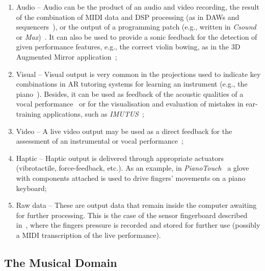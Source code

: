 \documentclass[10pt,journal,compsoc]{IEEEtran}
\newcommand{\node}[1]{{\fontfamily{cmss}\selectfont #1}}
\begin{document}
\begin{enumerate}[label=1.\arabic*.,leftmargin=0.7cm,listparindent=-\leftmargin, start=0]
\begin{enumerate}[label=1.2.\arabic*.,leftmargin=0.9cm,listparindent=-\leftmargin, start=0]
\item \node{Audio} -- Audio can be the product of an audio and video recording, the result of the combination of MIDI data and DSP processing (as in DAWs and sequencers~\cite{gall2005music}), or the output of a programming patch (e.g., written in \textit{Csound} or  \textit{Max})~\cite{manzo2016max}. It can also be used to provide a sonic feedback for the detection of given performance features, e.g., the correct violin bowing, as in the 3D Augmented Mirror application~\cite{3D_Augmented_Mirror};
\item \node{Visual} -- Visual output is very common in the projections used to indicate key combinations in AR tutoring systems for learning an instrument (e.g., the piano~\cite{holokeys}). Besides, it can be used as feedback of the acoustic qualities of a vocal performance~\cite{welch2004voxed} or for the visualisation and evaluation of mistakes in ear-training applications, such as \textit{IMUTUS}~\cite{imutus};
\item \node{Video} -- A live video output may be used as a direct feedback for the assessment of an instrumental or vocal performance~\cite{digital_violin_tutor};
\item \node{Haptic} -- Haptic output is delivered through appropriate actuators (vibrotactile, force-feedback, etc.). As an example, in \textit{PianoTouch}~\cite{pianotouch} a glove with components attached is used to drive fingers' movements on a piano keyboard;
\item \node{Raw data} -- These are output data that remain inside the computer awaiting for further processing. This is the case of the sensor fingerboard described in~\cite{grosshauser}, where the fingers pressure is recorded and stored for further use (possibly a MIDI transcription of the live performance).
\end{enumerate}
\end{enumerate}


\subsection{The Musical Domain}
\label{subsec:MD}
\end{document}
